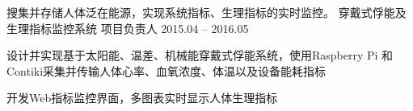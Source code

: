 \begin{cventries}
\cventry
{搜集并存储人体泛在能源，实现系统指标、生理指标的实时监控。} %
{穿戴式俘能及生理指标监控系统} %
{项目负责人} %
{2015.04 -- 2016.05} %
{ %
\begin{cvitems}
\item {设计并实现基于太阳能、温差、机械能穿戴式俘能系统，使用Raspberry Pi 和Contiki采集并传输人体心率、血氧浓度、体温以及设备能耗指标}
\item {开发Web指标监控界面，多图表实时显示人体生理指标}
\end{cvitems} 
}

\end{cventries}


